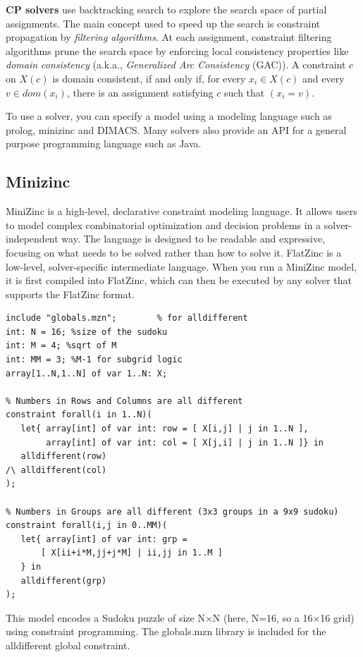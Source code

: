 \textbf{CP solvers} use backtracking search to explore the search space of partial assignments. The main concept used to speed up the search is constraint propagation by {\it filtering algorithms}. 
At each assignment, constraint filtering algorithms prune
the search space by enforcing local consistency properties like {\it domain consistency} (a.k.a., {\it Generalized Arc Consistency} (GAC)). A constraint $c$ on $X(c)$ is domain consistent, if and only if, for every  $x_i \in X(c)$ and every
$v \in dom(x_i)$, there is an assignment satisfying $c$ such that $(x_i = v)$.

To use a solver, you can specify a model using a modeling language such as prolog, minizinc and DIMACS.
Many solvers also provide an API for a general purpose programming language such as Java.


\subsection{Minizinc}
MiniZinc is a high-level, declarative constraint modeling language. 
It allows users to model complex combinatorial optimization and decision problems in a solver-independent way. 
The language is designed to be readable and expressive, focusing on what needs to be solved rather than how to solve it.
FlatZinc is a low-level, solver-specific intermediate language. 
When you run a MiniZinc model, it is first compiled into FlatZinc, which can then be executed by any solver that supports the FlatZinc format.

\begin{listing}[!h]
    \begin{lstlisting}[language=xml] 
include "globals.mzn";        % for alldifferent
int: N = 16; %size of the sudoku
int: M = 4; %sqrt of M
int: MM = 3; %M-1 for subgrid logic
array[1..N,1..N] of var 1..N: X;

% Numbers in Rows and Columns are all different
constraint forall(i in 1..N)(
   let{ array[int] of var int: row = [ X[i,j] | j in 1..N ],
        array[int] of var int: col = [ X[j,i] | j in 1..N ]} in
   alldifferent(row) 
/\ alldifferent(col)
);

% Numbers in Groups are all different (3x3 groups in a 9x9 sudoku)
constraint forall(i,j in 0..MM)(
   let{ array[int] of var int: grp = 
       [ X[ii+i*M,jj+j*M] | ii,jj in 1..M ] 
   } in
   alldifferent(grp)
);
\end{lstlisting}
\caption{Sudoku model in Minizinc}
\end{listing}
This model encodes a Sudoku puzzle of size N×N (here, N=16, so a 16×16 grid) using constraint programming.
The globals.mzn library is included for the alldifferent global constraint.


